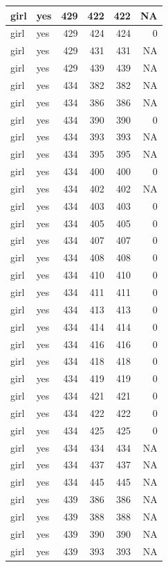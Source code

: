 \documentclass[man]{apa6}
\begin{document}
\begin{tabular}{l|l|r|r|r|r}
\hline
girl & yes & 429 & 422 & 422 & NA\\
\hline
girl & yes & 429 & 424 & 424 & 0\\
\hline
girl & yes & 429 & 431 & 431 & NA\\
\hline
girl & yes & 429 & 439 & 439 & NA\\
\hline
girl & yes & 434 & 382 & 382 & NA\\
\hline
girl & yes & 434 & 386 & 386 & NA\\
\hline
girl & yes & 434 & 390 & 390 & 0\\
\hline
girl & yes & 434 & 393 & 393 & NA\\
\hline
girl & yes & 434 & 395 & 395 & NA\\
\hline
girl & yes & 434 & 400 & 400 & 0\\
\hline
girl & yes & 434 & 402 & 402 & NA\\
\hline
girl & yes & 434 & 403 & 403 & 0\\
\hline
girl & yes & 434 & 405 & 405 & 0\\
\hline
girl & yes & 434 & 407 & 407 & 0\\
\hline
girl & yes & 434 & 408 & 408 & 0\\
\hline
girl & yes & 434 & 410 & 410 & 0\\
\hline
girl & yes & 434 & 411 & 411 & 0\\
\hline
girl & yes & 434 & 413 & 413 & 0\\
\hline
girl & yes & 434 & 414 & 414 & 0\\
\hline
girl & yes & 434 & 416 & 416 & 0\\
\hline
girl & yes & 434 & 418 & 418 & 0\\
\hline
girl & yes & 434 & 419 & 419 & 0\\
\hline
girl & yes & 434 & 421 & 421 & 0\\
\hline
girl & yes & 434 & 422 & 422 & 0\\
\hline
girl & yes & 434 & 425 & 425 & 0\\
\hline
girl & yes & 434 & 434 & 434 & NA\\
\hline
girl & yes & 434 & 437 & 437 & NA\\
\hline
girl & yes & 434 & 445 & 445 & NA\\
\hline
girl & yes & 439 & 386 & 386 & NA\\
\hline
girl & yes & 439 & 388 & 388 & NA\\
\hline
girl & yes & 439 & 390 & 390 & NA\\
\hline
girl & yes & 439 & 393 & 393 & NA\\

\end{tabular}
\end{document}
